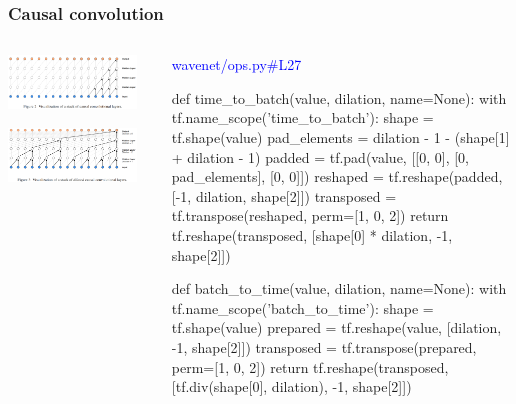 \documentclass[8pt]{beamer}
\begin{document}
\begin{frame}[fragile]
\frametitle{Causal convolution}
\begin{columns}
\begin{column}{0.5\textwidth}
 
\includegraphics[width=0.9\textwidth]{./dl3_images/causal_convolutions.png}

\includegraphics[width=0.9\textwidth]{./dl3_images/dilated_causal_convolutions.png}

\end{column}
\begin{column}{0.5\textwidth}
 
 \textcolor{blue}{wavenet/ops.py\#L27}
 
 \begin{verbnobox}[\tiny]
def time_to_batch(value, dilation, name=None):
    with tf.name_scope('time_to_batch'):
        shape = tf.shape(value)
        pad_elements = dilation - 1 - (shape[1] + dilation - 1) %
        padded = tf.pad(value, [[0, 0], [0, pad_elements], [0, 0]])
        reshaped = tf.reshape(padded, [-1, dilation, shape[2]])
        transposed = tf.transpose(reshaped, perm=[1, 0, 2])
        return tf.reshape(transposed, [shape[0] * dilation, -1, shape[2]])

def batch_to_time(value, dilation, name=None):
    with tf.name_scope('batch_to_time'):
        shape = tf.shape(value)
        prepared = tf.reshape(value, [dilation, -1, shape[2]])
        transposed = tf.transpose(prepared, perm=[1, 0, 2])
        return tf.reshape(transposed,
                          [tf.div(shape[0], dilation), -1, shape[2]])


\end{verbnobox}
\end{column}
\end{columns}
\end{frame}
\end{document}
